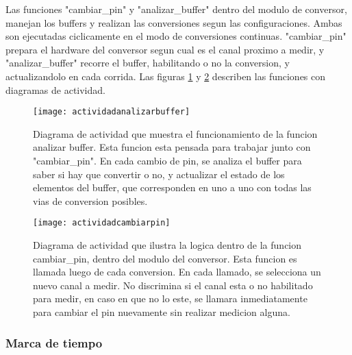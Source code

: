 Las funciones "cambiar\_pin" y "analizar\_buffer" dentro del modulo de conversor, manejan los buffers y realizan las conversiones segun las configuraciones. Ambas son ejecutadas ciclicamente en el modo de conversiones continuas. "cambiar\_pin" prepara el hardware del conversor segun cual es el canal proximo a medir, y "analizar\_buffer" recorre el buffer, habilitando o no la conversion, y actualizandolo en cada corrida. Las figuras \ref{fig:actividadanalizarbuffer} y \ref{fig:actividadcambiarpin} describen las funciones con diagramas de actividad.
 
\begin{figure}[h]
  \centering
  \texttt{[image: actividadanalizarbuffer]}
  \caption[Diagrama de actividad de la funcion analizar buffer]{Diagrama de actividad que muestra el funcionamiento de la funcion analizar buffer. Esta funcion esta pensada para trabajar junto con "cambiar\_pin". En cada cambio de pin, se analiza el buffer para saber si hay que convertir o no, y actualizar el estado de los elementos del buffer, que corresponden en uno a uno con todas las vias de conversion posibles.}\label{fig:actividadanalizarbuffer}
\end{figure}



\begin{figure}[h]
  \centering
  \texttt{[image: actividadcambiarpin]}
  \caption[Diagrama de actividad de la funcion cambiar pin]{Diagrama de actividad que ilustra la logica dentro de la funcion cambiar\_pin, dentro del modulo del conversor. Esta funcion es llamada luego de cada conversion. En cada llamado, se selecciona un nuevo canal a medir. No discrimina si el canal esta o no habilitado para medir, en caso en que no lo este, se llamara inmediatamente para cambiar el pin nuevamente sin realizar medicion alguna.}\label{fig:actividadcambiarpin}
\end{figure}

\subsubsection{Marca de tiempo} %
\label{ssub:marca_de_tiempo}

